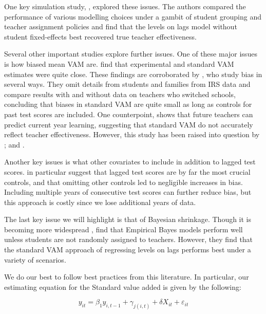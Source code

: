 \documentclass[letterpaper,12pt]{article}
\begin{document}
One key simulation study, \cite{guarino2015can}, explored these issues. The authors compared the performance of various modelling choices under a gambit of student grouping and teacher assignment policies and find that the levels on lags model without student fixed-effects best recovered true teacher effectiveness.

Several other important studies explore further issues. One of these major issues is how biased mean VAM are. \cite{kane2013have} find that experimental and standard VAM estimates were quite close. These findings are corroborated by \cite{chetty2014measuring1}, who study bias in several ways. They omit details from students and families from IRS data and compare results with and without data on teachers who switched schools, concluding that biases in standard VAM are quite small as long as controls for past test scores are included. One counterpoint, \cite{rothstein2010teacher} shows that future teachers can predict current year learning, suggesting that standard VAM do not accurately reflect teacher effectiveness. However, this study has been raised into question by \cite{goldhaber2015assessing, koedel2011does}; and \cite{guarino2015can}.

Another key issues is what other covariates to include in addition to lagged test scores. \cite{chetty2014measuring1} in particular suggest that lagged test scores are by far the most crucial controls, and that omitting other controls led to negligible increases in bias. Including multiple years of consecutive test scores can further reduce bias, but this approach is costly since we lose additional years of data.

The last key issue we will highlight is that of Bayesian shrinkage. Though it is becoming more widespread \citep{Koedel2015}, \cite{guarino2015evaluation} find that Empirical Bayes models perform well unless students are not randomly assigned to teachers. However, they find that the standard VAM approach of regressing levels on lags performs best under a variety of scenarios.

We do our best to follow best practices from this literature. In particular, our estimating equation for the Standard value added is given by the following:

    \begin{equation}\label{eq: standard}
        y_{it} = \beta_1 y_{i,t-1} + \gamma_{j(i,t)} + \delta X_{it} + \varepsilon_{it}
    \end{equation}
    
\end{document}
